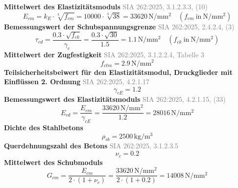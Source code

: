 \documentclass[11pt,a4paper]{article}
\newcommand{\normref}[1]{{\small\textcolor{gray}{#1}}}
\begin{document}
\noindent\textbf{Mittelwert des Elastizitätsmoduls} \hfill \normref{SIA 262:2025, 3.1.2.3.3, (10)}
\begin{equation*}
E_{cm} = k_E \cdot \sqrt[3]{f_{cm}} = 10000 \cdot \sqrt[3]{38} = 33620\,\mathrm{N}/\mathrm{mm}^{2} \quad \left(f_{cm}\ \text{in}\ \mathrm{N}/\mathrm{mm}^{2}\right)
\end{equation*}
\noindent\textbf{Bemessungswert der Schubspannungsgrenze} \hfill \normref{SIA 262:2025, 2.4.2.4, (3)}
\begin{equation*}
\tau_{cd} = \frac{0.3 \cdot \sqrt{f_{ck}}}{\gamma_c} = \frac{0.3 \cdot \sqrt{30}}{1.5} = 1.1\,\mathrm{N}/\mathrm{mm}^{2} \quad \left(f_{ck}\ \text{in}\ \mathrm{N}/\mathrm{mm}^{2}\right)
\end{equation*}
\noindent\textbf{Mittelwert der Zugfestigkeit} \hfill \normref{SIA 262:2025, 3.1.2.2.4, Tabelle 3}
\begin{equation*}
f_{ctm} = 2.9\,\mathrm{N}/\mathrm{mm}^{2}
\end{equation*}
\noindent\textbf{Teilsicherheitsbeiwert für den Elastizitätsmodul, Druckglieder mit Einflüssen 2. Ordnung} \hfill \normref{SIA 262:2025, 4.2.1.17}
\begin{equation*}
\gamma_{cE} = 1.2
\end{equation*}
\noindent\textbf{Bemessungswert des Elastizitätsmoduls} \hfill \normref{SIA 262:2025, 4.2.1.15, (33)}
\begin{equation*}
E_{cd} = \frac{E_{cm}}{\gamma_{cE}} = \frac{33620\,\mathrm{N}/\mathrm{mm}^{2}}{1.2} = 28016\,\mathrm{N}/\mathrm{mm}^{2}
\end{equation*}
\noindent\textbf{Dichte des Stahlbetons}
\begin{equation*}
\rho_{sb} = 2500\,\mathrm{kg}/\mathrm{m}^{3}
\end{equation*}
\noindent\textbf{Querdehnungszahl des Betons} \hfill \normref{SIA 262:2025, 3.1.2.3.5}
\begin{equation*}
\nu_c = 0.2
\end{equation*}
\noindent\textbf{Mittelwert des Schubmoduls}
\begin{equation*}
G_{cm} = \frac{E_{cm}}{2 \cdot \left(1 + \nu_c\right)} = \frac{33620\,\mathrm{N}/\mathrm{mm}^{2}}{2 \cdot \left(1 + 0.2\right)} = 14008\,\mathrm{N}/\mathrm{mm}^{2}
\end{equation*}
\end{document}
